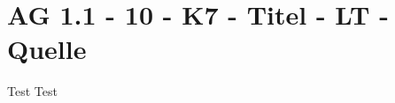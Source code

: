 \section{AG 1.1 - 10 - K7 - Titel - LT - Quelle}

\begin{beispiel}[AG 1.1]{1}
Test Test
\end{beispiel}